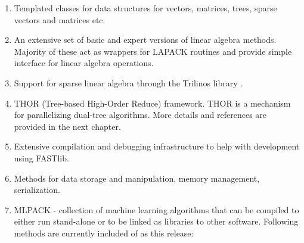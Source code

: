 \documentclass[letter]{report}
\begin{document}
\begin{enumerate}
\item Templated classes for data structures for vectors, matrices, trees, sparse vectors and matrices etc.
\item An extensive set of basic and expert versions of linear algebra methods. Majority of these act as wrappers for LAPACK routines and provide simple interface for linear algebra operations.
\item Support for sparse linear algebra through the Trilinos library \cite{heroux2005otp}.
\item THOR (Tree-based High-Order Reduce) framework. THOR is a mechanism for parallelizing dual-tree algorithms. More details and references are provided in the next chapter.
\item Extensive compilation and debugging infrastructure to help with development using FASTlib.
\item Methods for data storage and manipulation, memory management, serialization.
\item MLPACK - collection of machine learning algorithms that can be compiled to either run stand-alone or to be linked as libraries to other software. Following methods are currently included of as this release:


\end{enumerate}
\end{document}
